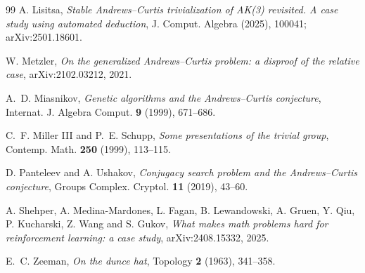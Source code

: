 \documentclass[11pt,a4paper]{article}
\theoremstyle{definition}
\begin{document}
\begin{thebibliography}{99}
 A. Lisitsa, \emph{Stable Andrews--Curtis trivialization of AK(3) revisited. A case study using automated deduction}, J. Comput. Algebra (2025), 100041; arXiv:2501.18601.

 W. Metzler, \emph{On the generalized Andrews--Curtis problem: a disproof of the relative case}, arXiv:2102.03212, 2021.

 A.~D. Miasnikov, \emph{Genetic algorithms and the Andrews--Curtis conjecture}, Internat. J. Algebra Comput. \textbf{9} (1999), 671--686.

 C.~F. Miller III and P.~E. Schupp, \emph{Some presentations of the trivial group}, Contemp. Math. \textbf{250} (1999), 113--115.

 D. Panteleev and A. Ushakov, \emph{Conjugacy search problem and the Andrews--Curtis conjecture}, Groups Complex. Cryptol. \textbf{11} (2019), 43--60.

 A. Shehper, A. Medina-Mardones, L. Fagan, B. Lewandowski, A. Gruen, Y. Qiu, P. Kucharski, Z. Wang and S. Gukov, \emph{What makes math problems hard for reinforcement learning: a case study}, arXiv:2408.15332, 2025.

 E.~C. Zeeman, \emph{On the dunce hat}, Topology \textbf{2} (1963), 341--358.

\end{thebibliography}
\end{document}
